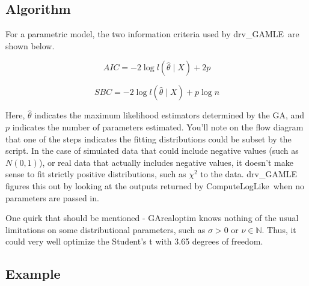 \documentclass{book}
\newcommand{\textcode}[1]{\textsf{\small #1}}   %
\begin{document}
\subsection*{Algorithm}

For a parametric model, the two information criteria used by \textcode{%
drv\_GAMLE}\ are shown below.

\begin{equation}
AIC=-2\log l\left( \hat{\theta}\mid X\right) +2p  \label{eqn_AIC}
\end{equation}

\begin{equation}
SBC=-2\log l\left( \hat{\theta}\mid X\right) +p\log n  \label{eqn_SBC}
\end{equation}

Here, $\hat{\theta}$ indicates the maximum likelihood
estimators determined by the GA, and $p$ indicates the number
of parameters estimated. You'll note on the flow diagram that
one of the steps indicates the fitting distributions could be
subset by the script. In the case of simulated data that could
include negative values (such as $N\left( 0,1\right) $), or
real data that actually includes negative values, it doesn't
make sense to fit strictly positive distributions, such as
$\chi ^{2}$ to the data. \textcode{drv\_GAMLE} figures this out
by looking at the outputs returned by
\textcode{ComputeLogLike}\ when no parameters are passed in.

One quirk that should be mentioned - \textcode{GArealoptim}
knows nothing of the usual limitations on some distributional parameters, such as $%
\sigma >0$ or $\nu \in \mathbb{N}$. Thus, it could very well
optimize the Student's t with 3.65 degrees of freedom.

\subsection*{Example}
\end{document}
